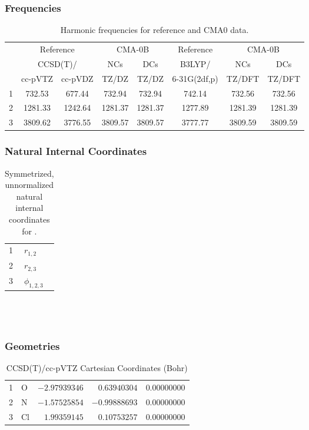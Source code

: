 \documentclass[10pt,oneside]{article}
\begin{document}
\subsubsection*{Frequencies}
\begin{table}[h!]
\centering
\caption{Harmonic frequencies for reference and CMA0 data.}
\begin{tabular}{cccccccc}
\toprule
{} & \multicolumn{2}{c}{Reference} & \multicolumn{2}{c}{CMA-0B} &    Reference & \multicolumn{2}{c}{CMA-0B} \\
{} & \multicolumn{2}{c}{CCSD(T)/} &     NCs &     DCs &       B3LYP/ &     NCs &     DCs \\
{} &   cc-pVTZ & cc-pVDZ &   TZ/DZ &   TZ/DZ & 6-31G(2df,p) &  TZ/DFT &  TZ/DFT \\
\midrule
1 &    732.53 &  677.44 &  732.94 &  732.94 &       742.14 &  732.56 &  732.56 \\
2 &   1281.33 & 1242.64 & 1281.37 & 1281.37 &      1277.89 & 1281.39 & 1281.39 \\
3 &   3809.62 & 3776.55 & 3809.57 & 3809.57 &      3777.77 & 3809.59 & 3809.59 \\
\bottomrule
\end{tabular}
\end{table}

\clearpage

\subsubsection*{Natural Internal Coordinates}
\begin{table}[h!]
\centering
\caption{Symmetrized, unnormalized natural internal coordinates for .}
\small
\begin{tabular}{ll}
  1   & $r_{1,2}$ \\
  2   & $r_{2,3}$ \\
  3   & $\phi_{1,2,3}$ \\
\end{tabular}
\end{table}

\clearpage

\subsection{\ \ \ }

\subsubsection*{Geometries}
\begin{table}[h!]
\centering
\caption{CCSD(T)/cc-pVTZ Cartesian Coordinates (Bohr)}
\begin{tabular}{llrrr}
1  & O  & $-2.97939346$ & $ 0.63940304$ & $ 0.00000000$ \\
2  & N  & $-1.57525854$ & $-0.99888693$ & $ 0.00000000$ \\
3  & Cl & $ 1.99359145$ & $ 0.10753257$ & $ 0.00000000$ \\
\end{tabular}
\end{table}
\end{document}
